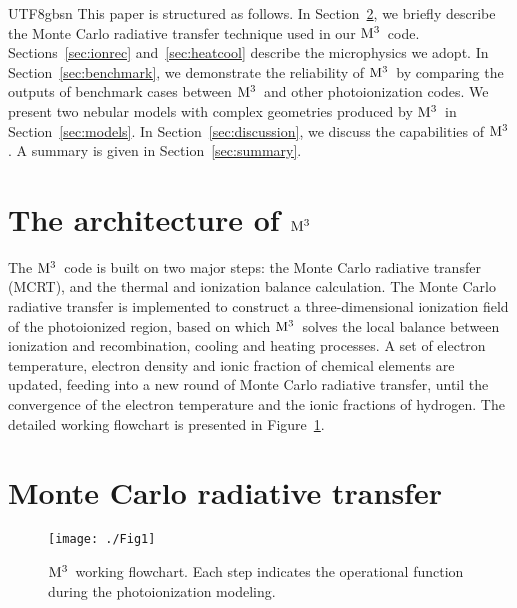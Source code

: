 \documentclass[twocolumn]{aastex62}
\newcommand{\newcode}{{$\rm M^3$}}
\begin{document}
\begin{CJK*}{UTF8}{gbsn}
This paper is structured as follows. 
In Section~\ref{sec:mcrt}, we briefly describe the Monte Carlo radiative transfer technique used in our \newcode\ code.
Sections~\ref{sec:ionrec} and~\ref{sec:heatcool} describe the microphysics we adopt.
In Section~\ref{sec:benchmark}, we demonstrate the reliability of \newcode\ by comparing the outputs of benchmark cases between \newcode\ and other photoionization codes.
We present two nebular models with complex geometries produced by \newcode\ in Section~\ref{sec:models}.
In Section~\ref{sec:discussion}, we discuss the capabilities of \newcode .
A summary is given in Section~\ref{sec:summary}.


\section{The architecture of \newcode }

The \newcode\ code is built on two major steps: the Monte Carlo radiative transfer (MCRT), and the thermal and ionization balance calculation.
The Monte Carlo radiative transfer is implemented to construct a three-dimensional ionization field of the photoionized region, based on which \newcode\ solves the local balance between ionization and recombination, cooling and heating processes.
A set of electron temperature, electron density and ionic fraction of chemical elements are updated, feeding into a new round of Monte Carlo radiative transfer, until the convergence of the electron temperature and the ionic fractions of hydrogen. 
The detailed working flowchart is presented in Figure~\ref{fig1}.
 
\section{Monte Carlo radiative transfer}\label{sec:mcrt}

\begin{figure*}
  \centering
  \texttt{[image: ./Fig1]}
  \caption{\newcode\ working flowchart. Each step indicates the operational function during the photoionization modeling.}\label{fig1}
\end{figure*}




\end{CJK*}
\end{document}
